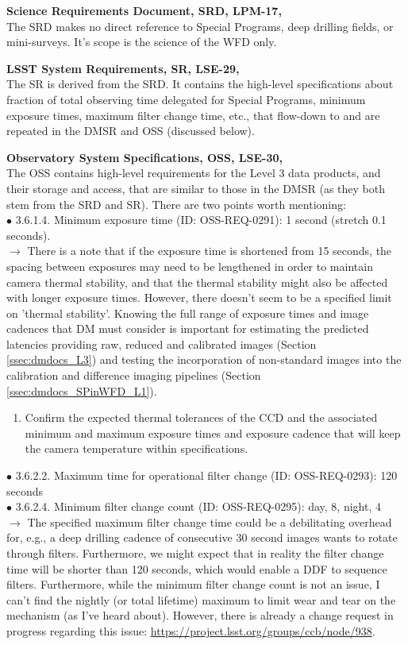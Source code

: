 \documentclass[DM,lsstdraft,toc]{lsstdoc}
\begin{document}
\noindent \textbf{Science Requirements Document, SRD, LPM-17, \cite{LPM-17}}\\
The SRD makes no direct reference to Special Programs, deep drilling fields, or mini-surveys. It's scope is the science of the WFD only.

\noindent \textbf{LSST System Requirements, SR, LSE-29, \cite{LSE-29}}\\
The SR is derived from the SRD. It contains the high-level specifications about fraction of total observing time delegated for Special Programs, minimum exposure times, maximum filter change time, etc., that flow-down to and are repeated in the DMSR and OSS (discussed below).

\noindent \textbf{Observatory System Specifications, OSS, LSE-30, \cite{LSE-30}}\\
The OSS contains high-level requirements for the Level 3 data products, and their storage and access, that are similar to those in the DMSR (as they both stem from the SRD and SR). There are two points worth mentioning: \\
$\bullet$ 3.6.1.4. Minimum exposure time (ID: OSS-REQ-0291): 1 second (stretch 0.1 seconds). \\
$\rightarrow$ There is a note that if the exposure time is shortened from 15 seconds, the spacing between exposures may need to be lengthened in order to maintain camera thermal stability, and that the thermal stability might also be affected with longer exposure times. However, there doesn't seem to be a specified limit on 'thermal stability'. Knowing the full range of exposure times and image cadences that DM must consider is important for estimating the predicted latencies providing raw, reduced and calibrated images (Section \ref{ssec:dmdocs_L3}) and testing the incorporation of non-standard images into the calibration and difference imaging pipelines (Section \ref{ssec:dmdocs_SPinWFD_L1}).
\begin{enumerate}[resume,topsep=-10pt,label= \textbf{Action \Roman*.}] \item Confirm the expected thermal tolerances of the CCD and the associated minimum and maximum exposure times and exposure cadence that will keep the camera temperature within specifications. \end{enumerate}
$\bullet$ 3.6.2.2. Maximum time for operational filter change (ID: OSS-REQ-0293): 120 seconds \\
$\bullet$ 3.6.2.4. Minimum filter change count (ID: OSS-REQ-0295): day, 8, night, 4 \\
$\rightarrow$ The specified maximum filter change time could be a debilitating overhead for, e.g., a deep drilling cadence of consecutive 30 second images wants to rotate through filters. Furthermore, we might expect that in reality the filter change time will be shorter than 120 seconds, which would enable a DDF to sequence filters. Furthermore, while the minimum filter change count is not an issue, I can't find the nightly (or total lifetime) maximum to limit wear and tear on the mechanism (as I've heard about). However, there is already a change request in progress regarding this issue: \url{https://project.lsst.org/groups/ccb/node/938}.
\end{document}
